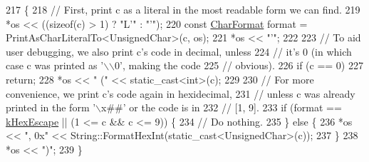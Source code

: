 \begin{DoxyCode}
217                                              \{
218   \textcolor{comment}{// First, print c as a literal in the most readable form we can find.}
219   *os << ((sizeof(c) > 1) ? \textcolor{stringliteral}{"L'"} : \textcolor{stringliteral}{"'"});
220   \textcolor{keyword}{const} \hyperlink{namespacetesting_1_1internal_ae2ef98247c76a50cdc80ceb4a6c81793}{CharFormat} format = PrintAsCharLiteralTo<UnsignedChar>(c, os);
221   *os << \textcolor{stringliteral}{"'"};
222 
223   \textcolor{comment}{// To aid user debugging, we also print c's code in decimal, unless}
224   \textcolor{comment}{// it's 0 (in which case c was printed as '\(\backslash\)\(\backslash\)0', making the code}
225   \textcolor{comment}{// obvious).}
226   \textcolor{keywordflow}{if} (c == 0)
227     \textcolor{keywordflow}{return};
228   *os << \textcolor{stringliteral}{" ("} << \textcolor{keyword}{static\_cast<}\textcolor{keywordtype}{int}\textcolor{keyword}{>}(c);
229 
230   \textcolor{comment}{// For more convenience, we print c's code again in hexidecimal,}
231   \textcolor{comment}{// unless c was already printed in the form '\(\backslash\)x##' or the code is in}
232   \textcolor{comment}{// [1, 9].}
233   \textcolor{keywordflow}{if} (format == \hyperlink{namespacetesting_1_1internal_ae2ef98247c76a50cdc80ceb4a6c81793aebfa5293302338a8e8678744c103f113}{kHexEscape} || (1 <= c && c <= 9)) \{
234     \textcolor{comment}{// Do nothing.}
235   \} \textcolor{keywordflow}{else} \{
236     *os << \textcolor{stringliteral}{", 0x"} << String::FormatHexInt(static\_cast<UnsignedChar>(c));
237   \}
238   *os << \textcolor{stringliteral}{")"};
239 \}
\end{DoxyCode}
\mbox{\label{namespacetesting_1_1internal_a0be71e6d7cb274131c559193f81c83e2}} 
